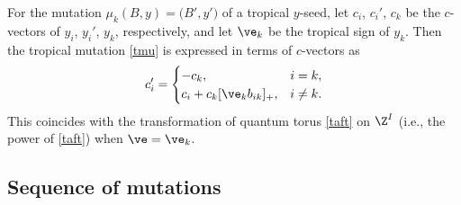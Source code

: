 \begin{Remark}\label{re:sgni}
For the mutation $\mu_k (B,y) = \bigl(B',y'\bigr)$ of a tropical $y$-seed,
let $c_i$, $c_i'$, $c_k$ be the $c$-vectors of $y_i$, $y_i'$, $y_k$, respectively,
and let $\ve_k$ be the tropical sign of $y_k$.
Then the tropical mutation \eqref{tmu} is expressed in terms of $c$-vectors as
\begin{align*}
 c_i' =
 \begin{cases}
 -c_k, & i=k,
 \\
 c_i + c_k [\ve_k b_{ik}]_+, & i \neq k.
\end{cases}
\end{align*}
This coincides with the transformation of quantum torus \eqref{taft}
on $\Z^I$ (i.e., the power of \eqref{taft}) when $\ve = \ve_k$.
\end{Remark}

\subsection{Sequence of mutations}

